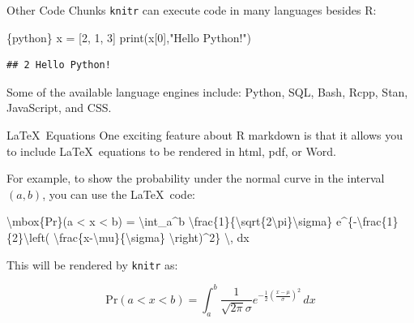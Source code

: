 \documentclass[
  ignorenonframetext,
  aspectratio=169]{beamer}
\newenvironment{Shaded}{\begin{snugshade}}{\end{snugshade}}
\newcommand{\NormalTok}[1]{#1}
\begin{document}
\begin{frame}[fragile]{Other Code Chunks}
\label{other-code-chunks}
\texttt{knitr} can execute code in many languages besides R:

\begin{Shaded}
\begin{Highlighting}[]
\NormalTok{\textasciigrave{}\textasciigrave{}\textasciigrave{}\{python\}}
\NormalTok{x = [2, 1, 3]}
\NormalTok{print(x[0],"Hello Python!")}
\NormalTok{\textasciigrave{}\textasciigrave{}\textasciigrave{}}
\end{Highlighting}
\end{Shaded}

\begin{verbatim}
## 2 Hello Python!
\end{verbatim}

Some of the available language engines include: Python, SQL, Bash, Rcpp,
Stan, JavaScript, and CSS.
\end{frame}

\begin{frame}[fragile]{\LaTeX~Equations}
\label{equations}
One exciting feature about R markdown is that it allows you to include
\LaTeX~equations to be rendered in html, pdf, or Word.

For example, to show the probability under the normal curve in the
interval \((a,b)\), you can use the \LaTeX~code: \footnotesize

\begin{Shaded}
\begin{Highlighting}[]
\NormalTok{\textbackslash{}mbox\{Pr\}(a \textless{} x \textless{} b) = }
\NormalTok{  \textbackslash{}int\_a\^{}b \textbackslash{}frac\{1\}\{\textbackslash{}sqrt\{2\textbackslash{}pi\}\textbackslash{}sigma\} }
\NormalTok{  e\^{}\{{-}\textbackslash{}frac\{1\}\{2\}\textbackslash{}left( \textbackslash{}frac\{x{-}\textbackslash{}mu\}\{\textbackslash{}sigma\} \textbackslash{}right)\^{}2\} \textbackslash{}, dx}
\end{Highlighting}
\end{Shaded}

\normalsize

This will be rendered by \texttt{knitr} as:

\[\mbox{Pr}(a < x < b) = \int_a^b \frac{1}{\sqrt{2\pi}\sigma} e^{-\frac{1}{2}\left( \frac{x-\mu}{\sigma} \right)^2} \, dx\]
\end{frame}
\end{document}
